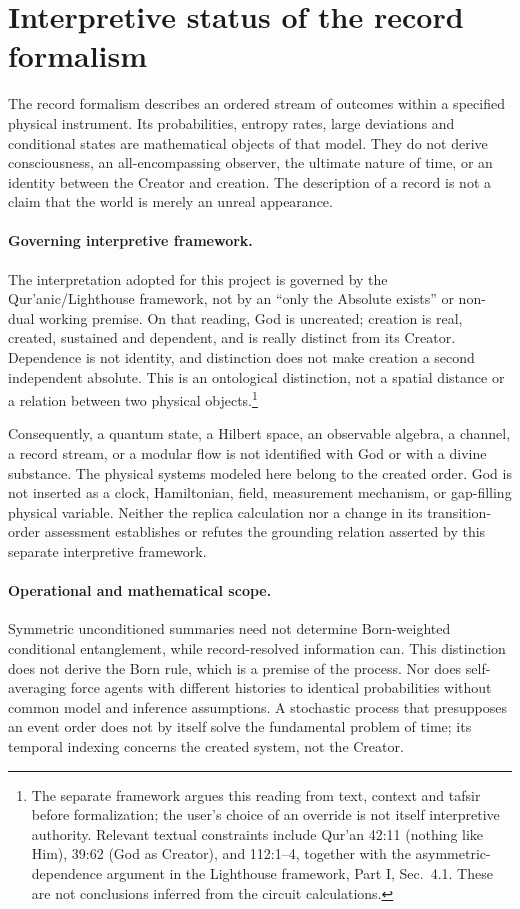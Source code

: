 \section{Interpretive status of the record formalism}
\label{sec:interpretation}

The record formalism describes an ordered stream of outcomes within a specified physical instrument. Its probabilities, entropy rates, large deviations and conditional states are mathematical objects of that model. They do not derive consciousness, an all-encompassing observer, the ultimate nature of time, or an identity between the Creator and creation. The description of a record is not a claim that the world is merely an unreal appearance.

\paragraph{Governing interpretive framework.}
The interpretation adopted for this project is governed by the Qur'anic/Lighthouse framework, not by an ``only the Absolute exists'' or non-dual working premise. On that reading, God is uncreated; creation is real, created, sustained and dependent, and is really distinct from its Creator. Dependence is not identity, and distinction does not make creation a second independent absolute. This is an ontological distinction, not a spatial distance or a relation between two physical objects.\footnote{The separate framework argues this reading from text, context and tafsir before formalization; the user's choice of an override is not itself interpretive authority. Relevant textual constraints include Qur'an 42:11 (nothing like Him), 39:62 (God as Creator), and 112:1--4, together with the asymmetric-dependence argument in the Lighthouse framework, Part I, Sec.~4.1. These are not conclusions inferred from the circuit calculations.}

Consequently, a quantum state, a Hilbert space, an observable algebra, a channel, a record stream, or a modular flow is not identified with God or with a divine substance. The physical systems modeled here belong to the created order. God is not inserted as a clock, Hamiltonian, field, measurement mechanism, or gap-filling physical variable. Neither the replica calculation nor a change in its transition-order assessment establishes or refutes the grounding relation asserted by this separate interpretive framework.

\paragraph{Operational and mathematical scope.}
Symmetric unconditioned summaries need not determine Born-weighted conditional entanglement, while record-resolved information can. This distinction does not derive the Born rule, which is a premise of the process. Nor does self-averaging force agents with different histories to identical probabilities without common model and inference assumptions. A stochastic process that presupposes an event order does not by itself solve the fundamental problem of time; its temporal indexing concerns the created system, not the Creator.

